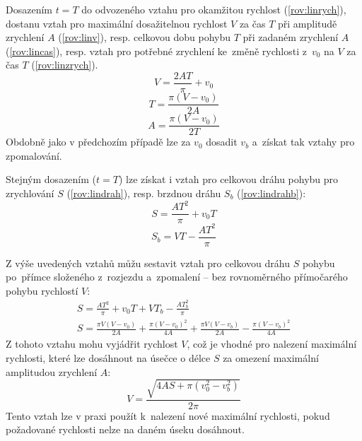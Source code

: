 		Dosazením $t=T$ do odvozeného vztahu  pro okamžitou rychlost (\ref{rov:linrych}), dostanu vztah pro maximální dosažitelnou rychlost $V$ za čas $T$ při amplitudě zrychlení $A$ (\ref{rov:linv}), resp. celkovou dobu pohybu $T$ při zadaném zrychlení $A$ (\ref{rov:lincas}), resp. vztah pro potřebné zrychlení ke~změně rychlosti z~$v_0$ na $V$ za čas $T$ (\ref{rov:linzrych}).
		\begin{equation}
			\label{rov:linv}
			V=\frac{2AT}{\pi} + v_0
		\end{equation}
		\begin{equation}
			\label{rov:lincas}
			T=\frac{\pi \left(V - v_0\right)}{2A}
		\end{equation}
		\begin{equation}
			\label{rov:linzrych}
			A=\frac{\pi \left(V - v_0\right)}{2T}
		\end{equation}
		Obdobně jako v předchozím případě lze za $v_0$ dosadit $v_b$ a~získat tak vztahy pro zpomalování.
		
		Stejným dosazením ($t=T$) lze získat i vztah pro celkovou dráhu pohybu pro zrychlování $S$ (\ref{rov:lindrah}), resp. brzdnou dráhu $S_b$ (\ref{rov:lindrahb}):
		\begin{equation}
			\label{rov:lindrah}
			S = \frac{AT^2}{\pi} + v_0 T
		\end{equation}
		\begin{equation}
		\label{rov:lindrahb}
			S_b = VT -\frac{AT^2}{\pi}
		\end{equation}
		
		Z výše uvedených vztahů můžu sestavit vztah pro celkovou dráhu $S$ pohybu po~přímce složeného z~rozjezdu a~zpomalení -- bez rovnoměrného přímočarého pohybu rychlostí $V$:
		\begin{eqnarray}
			S=\frac{AT^2}{\pi} + v_0 T + V T_b -\frac{AT_b^2}{\pi} \nonumber \\
			S=\frac{\pi V\left(V-v_0\right)}{2A}+\frac{\pi \left(V-v_0\right)^2}{4A}+\frac{\pi V\left(V-v_b\right)}{2A}-\frac{\pi \left(V-v_b\right)^2}{4A}
		\end{eqnarray}
		Z tohoto vztahu mohu vyjádřit rychlost $V$, což je vhodné pro nalezení maximální rychlosti, které lze dosáhnout na úsečce o délce $S$ za omezení maximální amplitudou zrychlení $A$:
		\begin{equation}
			V=\frac{\sqrt{4AS+\pi\left(v_0^2-v_b^2\right)}}{2\pi}
		\end{equation}
		Tento vztah lze v praxi použít k~nalezení nové maximální rychlosti, pokud požadované rychlosti nelze na daném úseku dosáhnout.
		
